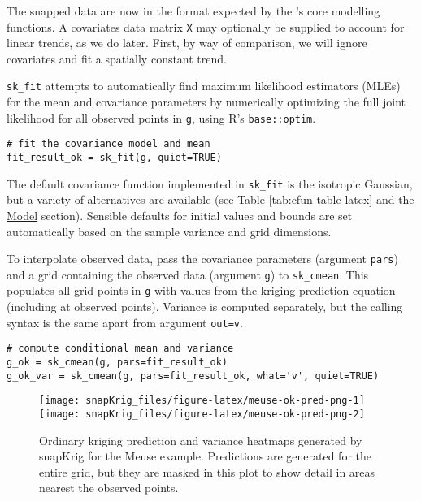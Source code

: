 The snapped data are now in the format expected by the 's core modelling functions. A covariates data matrix \texttt{X} may optionally be supplied to account for linear trends, as we do later. First, by way of comparison, we will ignore covariates and fit a spatially constant trend.

\texttt{sk\_fit} attempts to automatically find maximum likelihood estimators (MLEs) for the mean and covariance parameters by numerically optimizing the full joint likelihood for all observed points in \texttt{g}, using R's \texttt{base::optim}.

\begin{verbatim}
# fit the covariance model and mean
fit_result_ok = sk_fit(g, quiet=TRUE)
\end{verbatim}

The default covariance function implemented in \texttt{sk\_fit} is the isotropic Gaussian, but a variety of alternatives are available
(see Table \ref{tab:cfun-table-latex} and the \protect\hyperlink{model}{Model} section). Sensible defaults for initial values and bounds are set automatically based on the sample variance and grid dimensions.

To interpolate observed data, pass the covariance parameters (argument \texttt{pars}) and a grid containing the observed data (argument \texttt{g}) to \texttt{sk\_cmean}. This populates all grid points in \texttt{g} with values from the kriging prediction equation (including at observed points). Variance is computed separately, but the calling syntax is the same apart from argument \texttt{out=\textquotesingle{}v\textquotesingle{}}.

\begin{verbatim}
# compute conditional mean and variance 
g_ok = sk_cmean(g, pars=fit_result_ok)
g_ok_var = sk_cmean(g, pars=fit_result_ok, what='v', quiet=TRUE)
\end{verbatim}

\begin{figure}
\texttt{[image: snapKrig\_files/figure-latex/meuse-ok-pred-png-1]} \texttt{[image: snapKrig\_files/figure-latex/meuse-ok-pred-png-2]} \caption{Ordinary kriging prediction and variance heatmaps generated by snapKrig for the Meuse example. Predictions are generated for the entire grid, but they are masked in this plot to show detail in areas nearest the observed points.}\label{fig:meuse-ok-pred-png}
\end{figure}


